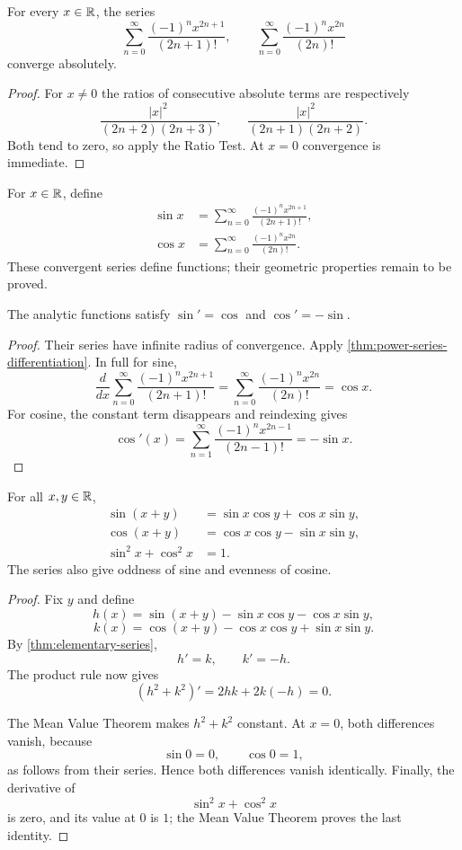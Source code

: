 \begin{proposition}
\label{prop:elementary-series-convergence}
For every $x\in\mathbb{R}$, the series
\[
\sum_{n=0}^{\infty}\frac{(-1)^nx^{2n+1}}{(2n+1)!},\qquad
\sum_{n=0}^{\infty}\frac{(-1)^nx^{2n}}{(2n)!}
\]
converge absolutely.
\end{proposition}
\begin{proof}
For $x\ne0$ the ratios of consecutive absolute terms are respectively
\[
\frac{|x|^2}{(2n+2)(2n+3)},\qquad
\frac{|x|^2}{(2n+1)(2n+2)}.
\]
Both tend to zero, so apply the Ratio Test. At $x=0$ convergence is immediate.
\end{proof}
\begin{definition}
\label{def:analytic-elementary-functions}
For $x\in\mathbb{R}$, define
\[
\begin{aligned}
\sin x&=\sum_{n=0}^{\infty}\frac{(-1)^nx^{2n+1}}{(2n+1)!},\\
\cos x&=\sum_{n=0}^{\infty}\frac{(-1)^nx^{2n}}{(2n)!}.
\end{aligned}
\]
These convergent series define functions; their geometric properties remain
to be proved.
\end{definition}
\begin{theorem}\label{thm:elementary-series}
The analytic functions satisfy $\sin'=\cos$ and $\cos'=-\sin$.
\end{theorem}
\begin{proof}
Their series have infinite radius of convergence. Apply
\cref{thm:power-series-differentiation}. In full for sine,
\[
\frac{d}{dx}\sum_{n=0}^\infty\frac{(-1)^nx^{2n+1}}{(2n+1)!}
=\sum_{n=0}^\infty\frac{(-1)^nx^{2n}}{(2n)!}=\cos x.
\]
For cosine, the constant term disappears and reindexing gives
\[
\cos'(x)=\sum_{n=1}^\infty\frac{(-1)^nx^{2n-1}}{(2n-1)!}
=-\sin x.
\]
\end{proof}
\begin{theorem}
\label{thm:elementary-identities}
For all $x,y\in\mathbb{R}$,
\[
\begin{aligned}
\sin(x+y)&=\sin x\cos y+\cos x\sin y,\\
\cos(x+y)&=\cos x\cos y-\sin x\sin y,\\
\sin^2x+\cos^2x&=1.
\end{aligned}
\]
The series also give oddness of sine and evenness of cosine.
\end{theorem}
\begin{proof}
Fix $y$ and define
\[
h(x)=\sin(x+y)-\sin x\cos y-\cos x\sin y,
\]
\[
k(x)=\cos(x+y)-\cos x\cos y+\sin x\sin y.
\]
By \cref{thm:elementary-series},
\[
h'=k,
\qquad
k'=-h.
\]
The product rule now gives
\[
(h^2+k^2)'=2hk+2k(-h)=0.
\]

The Mean Value Theorem makes $h^2+k^2$ constant. At $x=0$, both differences vanish, because
\[
\sin0=0,\qquad\cos0=1,
\]
as follows from their series. Hence both differences vanish identically. Finally, the derivative of
\[
\sin^2x+\cos^2x
\]
is zero, and its value at $0$ is $1$; the Mean Value Theorem proves the last identity.
\end{proof}

